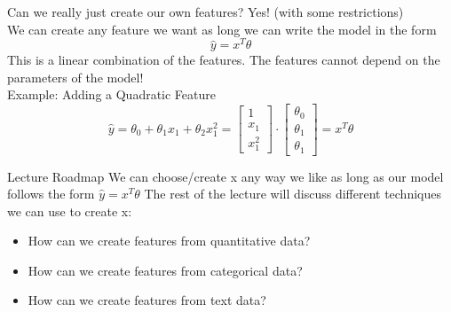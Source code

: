 \documentclass[aspectratio=169]{../latex_main/tntbeamer}  %
\begin{document}
	
	\begin{frame}{Can we really just create our own features?}
	    Yes! (with some restrictions)\\
	    We can create any feature we want as long we can write the model in the form
	    \begin{equation*}
	        \hat{y} = x^T\theta
	    \end{equation*}
	    This is a linear combination of the features. The features cannot depend on the parameters of the model!\\
	    Example: Adding a Quadratic Feature
	               \begin{equation*}
	                   \hat{y} = \theta_0 + \theta_1x_1 + \theta_2x_1^2 = \left[\begin{array}{c}
	                        1\\
	                        x_1\\
	                        x_1^2
	                   \end{array}\right] \cdot \left[\begin{array}{c}
	                        \theta_0\\
	                        \theta_1\\
	                        \theta_1
	                   \end{array}\right] = x^T\theta
	               \end{equation*} 
	\end{frame}
	
	
	\begin{frame}[c]{Lecture Roadmap}
	    We can choose/create x any way we like as long as our model follows the form $\hat{y}  = x^T\theta$
        The rest of the lecture will discuss different techniques we can use to create x:
        \begin{itemize}
            \item How can we create features from quantitative data?
            \item How can we create features from categorical data?
            \item How can we create features from text data? 
        \end{itemize} 
	\end{frame}
\end{document}
